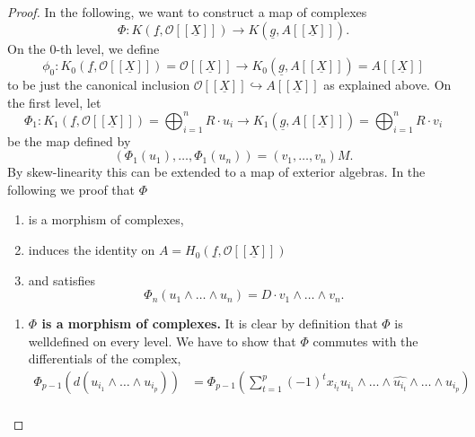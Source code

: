 \documentclass{article}
\theoremstyle{plain}%
\theoremstyle{definition}
\theoremstyle{remark}
\begin{document}
\begin{proof}
        In the following, we want to construct a map of complexes
        \[\Phi\colon K(\underline{f}, \mathcal{O}[[\underline{X}]]) \to K(\underline{g}, A[[\underline{X}]]).\]
        On the 0-th level, we define 
        \[
            \phi_0 \colon K_0(\underline{f}, \mathcal{O}[[\underline{X}]]) = \mathcal{O}[[\underline{X}]] 
            \to 
            K_0(\underline{g}, A[[\underline{X}]]) = A[[\underline{X}]]
        \]
        to be just the canonical inclusion \(\mathcal{O}[[\underline{X}]] \hookrightarrow A[[\underline{X}]]\)
        as explained above.
        On the first level, let
        \[
            \Phi_1 \colon 
                K_1(\underline{f}, \mathcal{O}[[\underline{X}]]) = \bigoplus_{i = 1}^n R \cdot u_i
                \to 
                K_1(\underline{g}, A[[\underline{X}]]) = \bigoplus_{i=1}^n R \cdot v_i
        \]
        be the map defined by
        \[
            (\Phi_1(u_1), \dots, \Phi_1(u_n)) = (v_1, \dots, v_n)M. %
        \]
        By skew-linearity this can be extended to a map of exterior algebras. %
        In the following we proof that \(\Phi\)
        \begin{enumerate}
            \item is a morphism of complexes,
            \item induces the identity on \(A = H_0(\underline{f}, \mathcal{O}[[\underline{X}]])\)
            \item and satisfies
            \[
                \Phi_n(u_1 \wedge \dots \wedge u_n) = D \cdot v_1 \wedge \dots \wedge v_n.  
            \]
        \end{enumerate}
        \begin{enumerate}
            \item \textbf{\(\Phi\) is a morphism of complexes.}
            It is clear by definition that \(\Phi\) is welldefined on every level.
            We have to show that \(\Phi\) commutes with the differentials of the complex,
            \begin{align*}
                \Phi_{p-1}(d(u_{i_1}\!\wedge\!\dots\!\wedge\!u_{i_p})) 
                &= \Phi_{p-1}\left(\sum_{t=1}^p(-1)^t x_{i_t} 
                u_{i_1}\!\wedge\!\dots\!\wedge\!\widehat{u_{i_t}}\!\wedge\!\dots\!\wedge\!u_{i_p}\right)\\

\end{align*}
\end{enumerate}
\end{proof}
\end{document}
